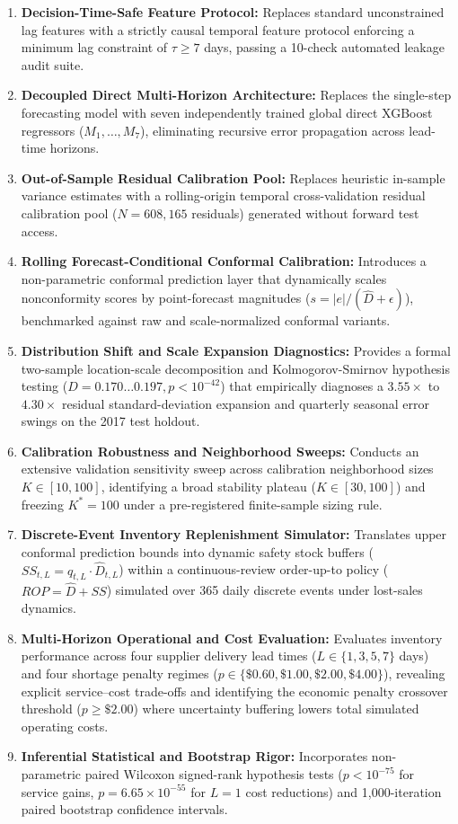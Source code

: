 \documentclass[11pt,a4paper]{article}
\begin{document}
\begin{enumerate}
    \item \textbf{Decision-Time-Safe Feature Protocol:} Replaces standard unconstrained lag features with a strictly causal temporal feature protocol enforcing a minimum lag constraint of $\tau \ge 7$ days, passing a 10-check automated leakage audit suite.
    \item \textbf{Decoupled Direct Multi-Horizon Architecture:} Replaces the single-step forecasting model with seven independently trained global direct XGBoost regressors ($M_1, \dots, M_7$), eliminating recursive error propagation across lead-time horizons.
    \item \textbf{Out-of-Sample Residual Calibration Pool:} Replaces heuristic in-sample variance estimates with a rolling-origin temporal cross-validation residual calibration pool ($N = 608,165$ residuals) generated without forward test access.
    \item \textbf{Rolling Forecast-Conditional Conformal Calibration:} Introduces a non-parametric conformal prediction layer that dynamically scales nonconformity scores by point-forecast magnitudes ($s = |e| / (\hat{D} + \epsilon)$), benchmarked against raw and scale-normalized conformal variants.
    \item \textbf{Distribution Shift and Scale Expansion Diagnostics:} Provides a formal two-sample location-scale decomposition and Kolmogorov-Smirnov hypothesis testing ($D = 0.170\dots0.197, p < 10^{-42}$) that empirically diagnoses a $3.55\times$ to $4.30\times$ residual standard-deviation expansion and quarterly seasonal error swings on the 2017 test holdout.
    \item \textbf{Calibration Robustness and Neighborhood Sweeps:} Conducts an extensive validation sensitivity sweep across calibration neighborhood sizes $K \in [10, 100]$, identifying a broad stability plateau ($K \in [30, 100]$) and freezing $K^* = 100$ under a pre-registered finite-sample sizing rule.
    \item \textbf{Discrete-Event Inventory Replenishment Simulator:} Translates upper conformal prediction bounds into dynamic safety stock buffers ($SS_{t,L} = q_{t,L} \cdot \hat{D}_{t,L}$) within a continuous-review order-up-to policy ($ROP = \hat{D} + SS$) simulated over 365 daily discrete events under lost-sales dynamics.
    \item \textbf{Multi-Horizon Operational and Cost Evaluation:} Evaluates inventory performance across four supplier delivery lead times ($L \in \{1, 3, 5, 7\}$ days) and four shortage penalty regimes ($p \in \{\$0.60, \$1.00, \$2.00, \$4.00\}$), revealing explicit service--cost trade-offs and identifying the economic penalty crossover threshold ($p \ge \$2.00$) where uncertainty buffering lowers total simulated operating costs.
    \item \textbf{Inferential Statistical and Bootstrap Rigor:} Incorporates non-parametric paired Wilcoxon signed-rank hypothesis tests ($p < 10^{-75}$ for service gains, $p = 6.65 \times 10^{-55}$ for $L=1$ cost reductions) and 1,000-iteration paired bootstrap confidence intervals.
\end{enumerate}
\end{document}
